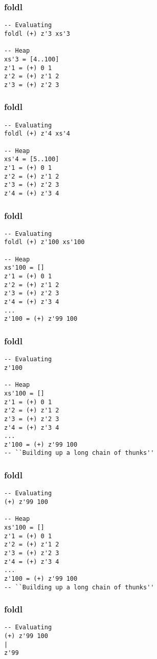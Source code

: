 \documentclass{beamer}
\begin{document}
\begin{frame}[t,fragile]
\frametitle{foldl}
\begin{verbatim}
-- Evaluating
foldl (+) z'3 xs'3

-- Heap
xs'3 = [4..100]
z'1 = (+) 0 1
z'2 = (+) z'1 2
z'3 = (+) z'2 3
\end{verbatim}
\end{frame}

\begin{frame}[t,fragile]
\frametitle{foldl}
\begin{verbatim}
-- Evaluating
foldl (+) z'4 xs'4

-- Heap
xs'4 = [5..100]
z'1 = (+) 0 1
z'2 = (+) z'1 2
z'3 = (+) z'2 3
z'4 = (+) z'3 4
\end{verbatim}
\end{frame}

\begin{frame}[t,fragile]
\frametitle{foldl}
\begin{verbatim}
-- Evaluating
foldl (+) z'100 xs'100

-- Heap
xs'100 = []
z'1 = (+) 0 1
z'2 = (+) z'1 2
z'3 = (+) z'2 3
z'4 = (+) z'3 4
...
z'100 = (+) z'99 100
\end{verbatim}
\end{frame}

\begin{frame}[t,fragile]
\frametitle{foldl}
\begin{verbatim}
-- Evaluating
z'100

-- Heap
xs'100 = []
z'1 = (+) 0 1
z'2 = (+) z'1 2
z'3 = (+) z'2 3
z'4 = (+) z'3 4
...
z'100 = (+) z'99 100
-- ``Building up a long chain of thunks''
\end{verbatim}
\end{frame}

\begin{frame}[t,fragile]
\frametitle{foldl}
\begin{verbatim}
-- Evaluating
(+) z'99 100

-- Heap
xs'100 = []
z'1 = (+) 0 1
z'2 = (+) z'1 2
z'3 = (+) z'2 3
z'4 = (+) z'3 4
...
z'100 = (+) z'99 100
-- ``Building up a long chain of thunks''
\end{verbatim}
\end{frame}

\begin{frame}[t,fragile]
\frametitle{foldl}
\begin{verbatim}
-- Evaluating
(+) z'99 100
|
z'99
\end{verbatim}
\end{frame}
\end{document}
